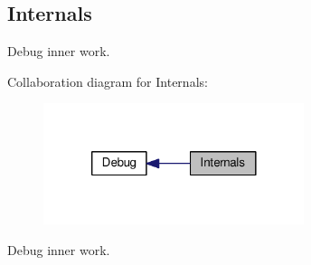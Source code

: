 \hypertarget{group__dbg__impl}{\subsection{Internals}
\label{group__dbg__impl}
}


Debug inner work.  


Collaboration diagram for Internals\-:\nopagebreak
\begin{figure}[H]
\begin{center}
\leavevmode
\includegraphics[width=216pt]{group__dbg__impl}
\end{center}
\end{figure}
Debug inner work. 